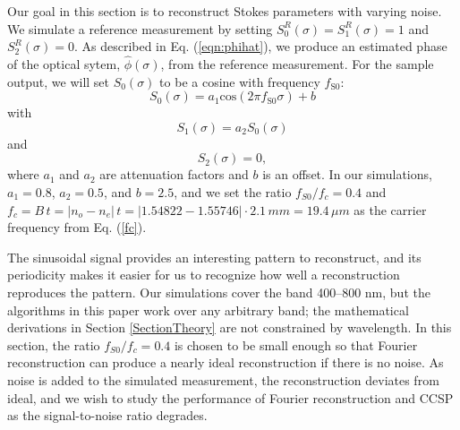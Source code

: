 \documentclass[10pt]{article}
\numberwithin{equation}{subsection}
\begin{document}
Our goal in this section is to reconstruct Stokes parameters with varying noise.
We simulate a reference measurement by setting $S_0^R(\sigma) = S_1^R(\sigma) = 1$ and $S_2^R(\sigma) = 0$.
As described in Eq. (\ref{eqn:phihat}), we produce an estimated phase of the optical sytem, $\widehat{\phi}(\sigma)$, from the reference measurement.
For the sample output, we will set $S_0(\sigma)$ to be a cosine with frequency $f_\text{S0}$:
\begin{equation}
    S_0(\sigma) = a_1 \text{cos} (2 \pi f_\text{S0} \sigma) + b
    \label{eqn:s0snr}
\end{equation}
with
   \begin{equation}
    S_1(\sigma) = a_2 S_0(\sigma)
    \label{eqn:s1snr}
\end{equation}
and
\begin{equation}
    S_2(\sigma) = 0,
    \label{eqn:s2snr}
\end{equation}
 where $a_1$ and $a_2$ are attenuation factors and $b$ is an offset.
  In our simulations, $a_1 = 0.8$, $a_2 = 0.5$, and $b = 2.5$, and we set the ratio $f_{S0}/f_c = 0.4$ and $f_c = B \, t = |n_o - n_e| \, t = |1.54822 - 1.55746| \cdot 2.1 \, mm = 19.4 \, \mu m$ as the carrier frequency from Eq. (\ref{fc}).

The sinusoidal signal provides an interesting pattern to reconstruct, and its periodicity makes it easier for us to recognize how well a reconstruction reproduces the pattern.
Our simulations cover the band 400--800 nm, but the algorithms in this paper work over any arbitrary band; the mathematical derivations in Section \ref{SectionTheory} are not constrained by wavelength.
In this section, the ratio $f_{S0}/f_c = 0.4$ is chosen to be small enough so that Fourier reconstruction can produce a nearly ideal reconstruction if there is no noise.
As noise is added to the simulated measurement, the reconstruction deviates from ideal, and we wish to study the performance of Fourier reconstruction and CCSP as the signal-to-noise ratio degrades.
\end{document}
